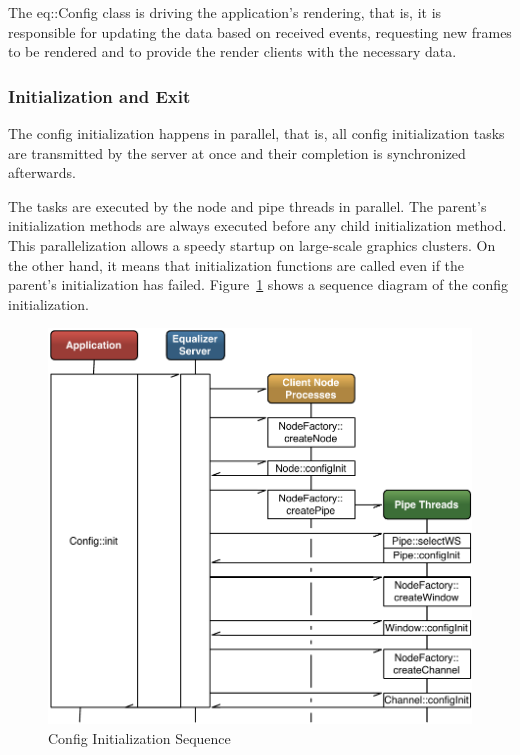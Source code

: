 \documentclass[10pt,a4]{scrartcl}
\newcommand{\fig}[1]{Figure~\ref{#1}}
\begin{document}
The \textsf{eq::Config} class is driving the application's rendering, that is,
it is responsible for updating the data based on received events, requesting new
frames to be rendered and to provide the render clients with the necessary data.

\subsubsection{Initialization and Exit}

The config initialization happens in parallel, that is, all config
initialization tasks are transmitted by the server at once and their
completion is synchronized afterwards. 

The tasks are executed by the node and pipe threads in parallel. The parent's
initialization methods are always executed before any child initialization
method. This parallelization allows a speedy startup on large-scale graphics
clusters. On the other hand, it means that initialization functions are called
even if the parent's initialization has failed. \fig{fConfigInit} shows a
sequence diagram of the config initialization.

\begin{figure}[ht!]\center
  \includegraphics[width=.9\textwidth]{images/configInit.pdf}
  {\caption{\label{fConfigInit}Config Initialization Sequence}}
\end{figure}
\end{document}
